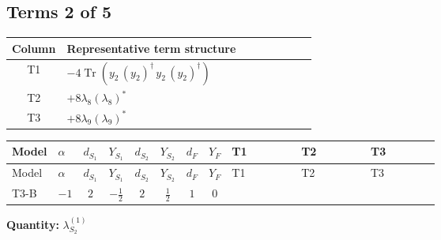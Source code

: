 \documentclass[8pt]{article}
\begin{document}
\begin{landscape}
\subsection*{Terms 2 of 5}
\begin{center}
\begin{tabular}{@{}c >{\raggedright\arraybackslash}p{0.82\linewidth}@{}}
\toprule
Column & Representative term structure \\
\midrule
T1 & \(\displaystyle -4 \operatorname{Tr}\!\left({y_2}\,\left({y_2}\right)^{\dagger}\,{y_2}\,\left({y_2}\right)^{\dagger}\right)\) \\
\midrule
T2 & \(\displaystyle +8 {\lambda_{8}} \left({\lambda_{8}}\right)^{*}\) \\
\midrule
T3 & \(\displaystyle +8 {\lambda_{9}} \left({\lambda_{9}}\right)^{*}\) \\
\midrule
\bottomrule
\end{tabular}
\end{center}
\smallskip
\tiny
\begin{longtable}{@{}llcccccc >{\raggedright\arraybackslash}p{0.21\linewidth} >{\raggedright\arraybackslash}p{0.21\linewidth} >{\raggedright\arraybackslash}p{0.21\linewidth}@{}}
\toprule
Model & $\alpha$ & $d_{S_1}$ & $Y_{S_1}$ & $d_{S_2}$ & $Y_{S_2}$ & $d_F$ & $Y_F$ & T1 & T2 & T3 \\
\midrule
\endfirsthead
\toprule
Model & $\alpha$ & $d_{S_1}$ & $Y_{S_1}$ & $d_{S_2}$ & $Y_{S_2}$ & $d_F$ & $Y_F$ & T1 & T2 & T3 \\
\midrule
\endhead
T3-B & $-1$ & $2$ & $-\frac{1}{2}$ & $2$ & $\frac{1}{2}$ & $1$ & $0$ & \scriptsize\adjustbox{max width=\linewidth}{$\begin{gathered} -4 \operatorname{Tr}\!\left({y_2}\,\left({y_2}\right)^{\dagger}\,{y_2}\,\left({y_2}\right)^{\dagger}\right)\end{gathered}$} & \scriptsize\adjustbox{max width=\linewidth}{$\begin{gathered} +8 {\lambda_{8}} \left({\lambda_{8}}\right)^{*}\end{gathered}$} & \scriptsize\adjustbox{max width=\linewidth}{$\begin{gathered} +8 {\lambda_{9}} \left({\lambda_{9}}\right)^{*}\end{gathered}$} \\
\midrule
\bottomrule
\end{longtable}
\clearpage
\noindent\textbf{Quantity: }$\lambda_{S_2}^{(1)}$\par\smallskip

\end{landscape}
\end{document}
